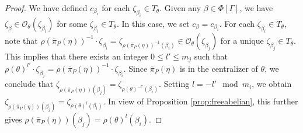 \documentclass[10pt,a4paper]{amsart}
\begin{document}
\begin{proof}
We have defined $c_{\beta_i}$ for each $\zeta_{\beta_i} \in T_{\theta}$. Given any $\beta \in \Phi[\Gamma]$, we have $\zeta_\beta\in  \mathcal{O}_{\theta}(\zeta_{\beta_i})$ for some $\zeta_{\beta_i} \in T_\theta$. In this case, we set $c_\beta=c_{\beta_{i}}$.  For each $\zeta_{\beta_i}\in T_\theta$, note that $\rho(\overline{\pi}_P(\eta))^{-1}\cdot\zeta_{\beta_i}=\zeta_{\rho(\overline{\pi}_P(\eta))^{-1}(\beta_i)} \in \mathcal{O}_{\theta}(\zeta_{\beta_j})$ for a unique $\zeta_{\beta_j} \in T_\theta$. This implies that there exists an integer $0\leq l'\leq m_j$ such that  $\rho(\theta)^{l'}\cdot \zeta_{\beta_j}=\rho(\overline{\pi}_P(\eta))^{-1}\cdot\zeta_{\beta_i}$. Since  $\overline{\pi}_P(\eta)$ is in the centralizer of $\theta$, we conclude that $\zeta_{\rho(\overline{\pi}_P(\eta))(\beta_j)}=\zeta_{\rho(\theta)^{-l'}(\beta_i)}$. Setting $l = -l' \mod m_i$, we obtain $\zeta_{\rho(\overline{\pi}_P(\eta))(\beta_j)}=\zeta_{\rho(\theta)^{l}(\beta_i)}$. In view of Proposition \ref{prop:freeabelian}, this further gives  $\rho(\overline{\pi}_P(\eta))(\beta_j)=\rho(\theta)^l(\beta_i)$.
\par


\end{proof}
\end{document}
